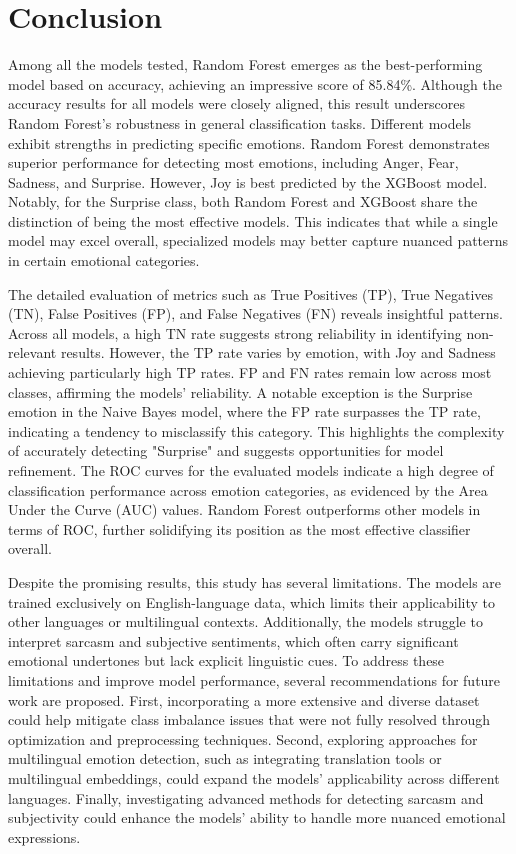 

\section{Conclusion}

Among all the models tested, Random Forest emerges as the best-performing model based on accuracy, achieving an impressive score of 85.84\%. Although the accuracy results for all models were closely aligned, this result underscores Random Forest's robustness in general classification tasks. Different models exhibit strengths in predicting specific emotions. Random Forest demonstrates superior performance for detecting most emotions, including Anger, Fear, Sadness, and Surprise. However, Joy is best predicted by the XGBoost model. Notably, for the Surprise class, both Random Forest and XGBoost share the distinction of being the most effective models. This indicates that while a single model may excel overall, specialized models may better capture nuanced patterns in certain emotional categories. 

The detailed evaluation of metrics such as True Positives (TP), True Negatives (TN), False Positives (FP), and False Negatives (FN) reveals insightful patterns. Across all models, a high TN rate suggests strong reliability in identifying non-relevant results. However, the TP rate varies by emotion, with Joy and Sadness achieving particularly high TP rates. FP and FN rates remain low across most classes, affirming the models' reliability. A notable exception is the Surprise emotion in the Naive Bayes model, where the FP rate surpasses the TP rate, indicating a tendency to misclassify this category. This highlights the complexity of accurately detecting "Surprise" and suggests opportunities for model refinement. The ROC curves for the evaluated models indicate a high degree of classification performance across emotion categories, as evidenced by the Area Under the Curve (AUC) values. Random Forest outperforms other models in terms of ROC, further solidifying its position as the most effective classifier overall.

Despite the promising results, this study has several limitations. The models are trained exclusively on English-language data, which limits their applicability to other languages or multilingual contexts. Additionally, the models struggle to interpret sarcasm and subjective sentiments, which often carry significant emotional undertones but lack explicit linguistic cues. To address these limitations and improve model performance, several recommendations for future work are proposed. First, incorporating a more extensive and diverse dataset could help mitigate class imbalance issues that were not fully resolved through optimization and preprocessing techniques. Second, exploring approaches for multilingual emotion detection, such as integrating translation tools or multilingual embeddings, could expand the models' applicability across different languages. Finally, investigating advanced methods for detecting sarcasm and subjectivity could enhance the models' ability to handle more nuanced emotional expressions.

